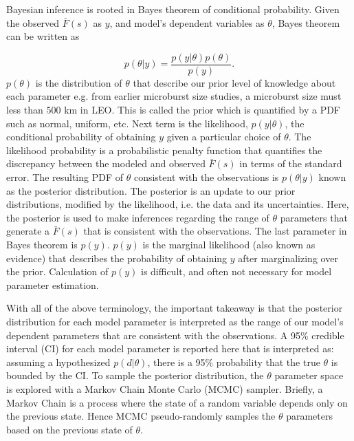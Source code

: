 \documentclass[draft]{agujournal2019}
\begin{document}
Bayesian inference is rooted in Bayes theorem of conditional probability. Given the observed $\bar{F}(s)$ as $y$, and model's dependent variables as $\theta$, Bayes theorem can be written as

\begin{equation}
p(\theta | y) = \frac{p(y | \theta) p(\theta)}{p(y)}.
\end{equation} $p(\theta)$ is the distribution of $\theta$ that describe our prior level of knowledge about each parameter e.g. from earlier microburst size studies, a microburst size must less than $500$ km in LEO. This is called the prior which is quantified by a PDF such as normal, uniform, etc. Next term is the likelihood, $p(y | \theta)$, the conditional probability of obtaining $y$ given a particular choice of $\theta$. The likelihood probability is a probabilistic penalty function that quantifies the discrepancy between the modeled and observed $\bar{F}(s)$ in terms of the standard error. The resulting PDF of $\theta$ consistent with the observations is $p(\theta | y)$ known as the posterior distribution. The posterior is an update to our prior distributions, modified by the likelihood, i.e. the data and its uncertainties. Here, the posterior is used to make inferences regarding the range of $\theta$ parameters that generate a $\bar{F}(s)$ that is consistent with the observations. The last parameter in Bayes theorem is $p(y)$. $p(y)$ is the marginal likelihood (also known as evidence) that describes the probability of obtaining $y$ after marginalizing over the prior. Calculation of $p(y)$ is difficult, and often not necessary for model parameter estimation. 

With all of the above terminology, the important takeaway is that the posterior distribution for each model parameter is interpreted as the range of our model's dependent parameters that are consistent with the observations. A 95\% credible interval (CI) for each model parameter is reported here that is interpreted as: assuming a hypothesized $p(d | \theta)$, there is a 95\% probability that the true $\theta$ is bounded by the CI. To sample the posterior distribution, the $\theta$ parameter space is explored with a Markov Chain Monte Carlo (MCMC) sampler. Briefly, a Markov Chain is a process where the state of a random variable depends only on the previous state. Hence MCMC pseudo-randomly samples the $\theta$ parameters based on the previous state of $\theta$. 
\end{document}
